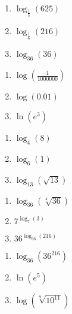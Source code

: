 \documentclass{ximera}
\begin{document}
\begin{multicols}{3}
\begin{enumerate}
\setcounter{enumi}{\value{HW}}

\item $\log_{\frac{1}{5}} (625)$
\item  $\log_{\frac{1}{6}} (216)$
\item $\log_{36} (36)$ 

\setcounter{HW}{\value{enumi}}
\end{enumerate}
\end{multicols}


\begin{multicols}{3}
\begin{enumerate}
\setcounter{enumi}{\value{HW}}

\item $\log \left(\frac{1}{1000000}\right)$
\item $\log(0.01)$
\item $\ln\left(e^3\right)$

\setcounter{HW}{\value{enumi}}
\end{enumerate}
\end{multicols}


\begin{multicols}{3}
\begin{enumerate}
\setcounter{enumi}{\value{HW}}

\item $\log_{4} (8)$
\item $\log_{6} (1)$
\item $\log_{13} \left(\sqrt{13}\right)$

\setcounter{HW}{\value{enumi}}
\end{enumerate}
\end{multicols}


\begin{multicols}{3}
\begin{enumerate}
\setcounter{enumi}{\value{HW}}

\item $\log_{36} \left(\sqrt[4]{36}\right)$
\item $7^{\log_{7} (3)}$
\item  $36^{\log_{36}(216)}$

\setcounter{HW}{\value{enumi}}
\end{enumerate}
\end{multicols}


\begin{multicols}{3}
\begin{enumerate}
\setcounter{enumi}{\value{HW}}

\item  $\log_{36} \left(36^{216}\right)$
\item $\ln \left(e^{5} \right)$
\item $\log \left(\sqrt[9]{10^{11}}\right)$

\setcounter{HW}{\value{enumi}}
\end{enumerate}
\end{multicols}
\end{document}
